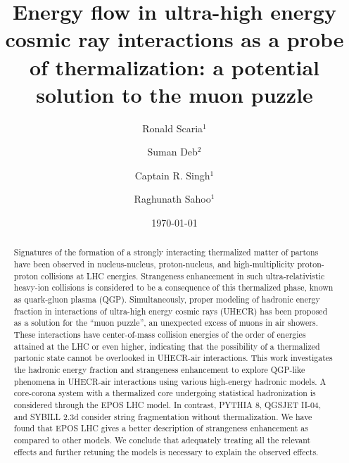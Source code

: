 \documentclass[aps,twocolumn,nofootinbib]{revtex4-1}
\begin{document}
\title{Energy flow in ultra-high energy cosmic ray  interactions as a probe of thermalization: a potential solution  to the muon puzzle}

\author{Ronald Scaria$^1$}
\author{Suman Deb$^2$}
\author{Captain R. Singh$^1$}
\author{Raghunath Sahoo$^1$}



\begin{abstract}

Signatures of the formation of a strongly interacting thermalized matter of partons have been observed in nucleus-nucleus, proton-nucleus, and high-multiplicity proton-proton collisions at LHC energies. Strangeness enhancement in such ultra-relativistic heavy-ion collisions is considered to be a consequence of this thermalized phase, known as quark-gluon plasma (QGP). Simultaneously, proper modeling of hadronic energy fraction in interactions of ultra-high energy cosmic rays (UHECR) has been proposed as a solution for the ``muon puzzle”, an unexpected excess of muons in air showers. These interactions have center-of-mass collision energies of the order of energies attained at the LHC or even higher, indicating that the possibility of a thermalized partonic state cannot be overlooked in UHECR-air interactions. This work investigates the hadronic energy fraction and strangeness enhancement to explore QGP-like phenomena in UHECR-air interactions using various high-energy hadronic models. A core-corona system with a thermalized core undergoing statistical hadronization is considered through the EPOS LHC model. In contrast, PYTHIA 8, QGSJET II-04, and SYBILL 2.3d consider string fragmentation without thermalization. We have found that EPOS LHC gives a better description of strangeness enhancement as compared to other models. We conclude that adequately treating all the relevant effects and further retuning the models is necessary to explain the observed effects.


\end{abstract}
\date{\today}
\maketitle
\end{document}
